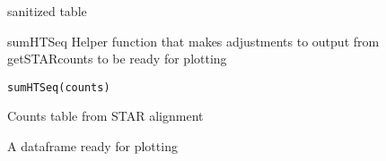 \documentclass[letterpaper]{book}
\begin{document}
%
\begin{Value}
sanitized table
\end{Value}
%
\begin{Description}\relax
sumHTSeq
Helper function that makes adjustments to output from getSTARcounts to be ready for plotting
\end{Description}
%
\begin{Usage}
\begin{verbatim}
sumHTSeq(counts)
\end{verbatim}
\end{Usage}
%
\begin{Arguments}
\begin{ldescription}
\item[\code{counts}] Counts table from STAR alignment
\end{ldescription}
\end{Arguments}
%
\begin{Value}
A dataframe ready for plotting
\end{Value}
\printindex{}
\end{document}
